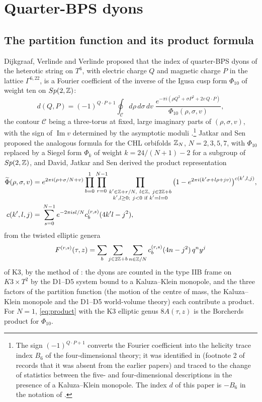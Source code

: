\section{Quarter-BPS dyons}\label{sec:dyons}

\subsection{The partition function and its product formula}\label{ssec:chl}

Dijkgraaf, Verlinde and Verlinde \cite{DVV97} proposed that the index of quarter-BPS dyons of the heterotic string on $T^6$, with electric charge $Q$ and magnetic charge $P$ in the lattice $\Gamma^{6,22}$, is a Fourier coefficient of the inverse of the Igusa cusp form $\Phi_{10}$ of weight ten on $Sp(2,\mathbb{Z})$:
\begin{equation}\label{eq:dvv}
d(Q,P) = (-1)^{Q\cdot P+1}\oint_{\mathcal C} d\rho\,d\sigma\,dv\; \frac{e^{-\pi i(\rho Q^2 + \sigma P^2 + 2 v\, Q\cdot P)}}{\Phi_{10}(\rho,\sigma,v)} ,
\end{equation}
the contour $\mathcal C$ being a three-torus at fixed, large imaginary parts of $(\rho,\sigma,v)$, with the sign of $\operatorname{Im} v$ determined by the asymptotic moduli \cite{Sen07walls}.\footnote{The sign $(-1)^{Q\cdot P+1}$ converts the Fourier coefficient into the helicity trace index $B_6$ of the four-dimensional theory; it was identified in \cite{Sen07walls,Sen07twocentred} (footnote 2 of \cite{Sen07twocentred} records that it was absent from the earlier papers) and traced to the change of statistics between the five- and four-dimensional descriptions in the presence of a Kaluza--Klein monopole. The index $d$ of this paper is $-B_6$ in the notation of \cite{Sen11positivity}.} Jatkar and Sen \cite{JatkarSen06} proposed the analogous formula for the CHL orbifolds $\mathbb{Z}_N$, $N=2,3,5,7$, with $\Phi_{10}$ replaced by a Siegel form $\Phi_k$ of weight $k = 24/(N+1)-2$ for a subgroup of $Sp(2,\mathbb{Z})$, and David, Jatkar and Sen \cite{DJS06,DJS07} derived the product representation
\begin{equation}\label{eq:product}
\begin{split}
\Phit(\rho,\sigma,v) ={}& e^{2\pi i(\rho + \sigma/N + v)}\prod_{b=0}^{1}\prod_{r=0}^{N-1}\prod_{\substack{k'\in\ZZ+r/N,\ l\in\ZZ,\ j\in 2\ZZ+b\\ k',l\ge 0;\ j<0 \text{ if } k'=l=0}}\big(1 - e^{2\pi i(k'\sigma + l\rho + jv)}\big)^{c(k',l,j)},\\
c(k',l,j) ={}& \sum_{s=0}^{N-1} e^{-2\pi i s l/N} c^{(r,s)}_b(4k'l-j^2),
\end{split}
\end{equation}
from the twisted elliptic genera
\[
F^{(r,s)}(\tau,z) = \sum_b\sum_{j\in 2\mathbb{Z}+b}\sum_{n\in\mathbb{Z}/N} c^{(r,s)}_b(4n-j^2)\, q^n y^j
\]
of K3, by the method of \cite{DVV97}: the dyons are counted in the type IIB frame on $K3\times T^2$ by the D1--D5 system bound to a Kaluza--Klein monopole, and the three factors of the partition function (the motion of the centre of mass, the Kaluza--Klein monopole and the D1--D5 world-volume theory) each contribute a product. For $N=1$, \eqref{eq:product} with the K3 elliptic genus $8A(\tau,z)$ is the Borcherds product for $\Phi_{10}$.

